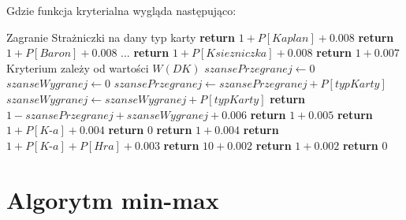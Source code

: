 Gdzie funkcja kryterialna wygląda następująco:
\begin{algorithmic}[1]
			 \Comment Zagranie Strażniczki na dany typ karty
				\State \textbf{return} $ 1 + P[Kaplan] + 0.008 $
			\EndCase
				\State \textbf{return} $ 1 + P[Baron]  + 0.008 $
			\EndCase
			\State ...
				\State \textbf{return} $ 1 + P[Ksiezniczka]  + 0.008 $
			\EndCase
				\State \textbf{return} $ 1 + 0.007 $
			\EndCase
				\Comment Kryterium zależy od wartości $W(DK)$
				\State $ szansePrzegranej \gets 0$ 
				\State $ szanseWygranej \gets 0$ 
						\State $szansePrzegranej \gets szansePrzegranej + P[typKarty]$ 
						\State $szanseWygranej \gets szanseWygranej + P[typKarty]$ 
					\EndIf
				\EndFor
				\State \textbf{return} $ 1 - szansePrzegranej + szanseWygranej + 0.006 $
			\EndCase
				\State \textbf{return} $ 1 + 0.005 $
			\EndCase
				\State \textbf{return} $ 1 + P[\textit{K-a}] + 0.004 $
			\EndCase
					\State \textbf{return} $ 0 $
				\Else
					\State \textbf{return} $ 1 + 0.004 $
				\EndIf
			\EndCase
				\State \textbf{return} $ 1 + P[\textit{K-a}] + P[Hra] + 0.003 $
			\EndCase
				\State \textbf{return} $ 10 + 0.002 $
			\EndCase
				\State \textbf{return} $ 1 + 0.002 $
			\EndCase
				\State \textbf{return} $ 0 $
			\EndCase
		\EndSwitch
	\EndFunction
\end{algorithmic}


\section{Algorytm min-max}
\label{sec:minmax}
